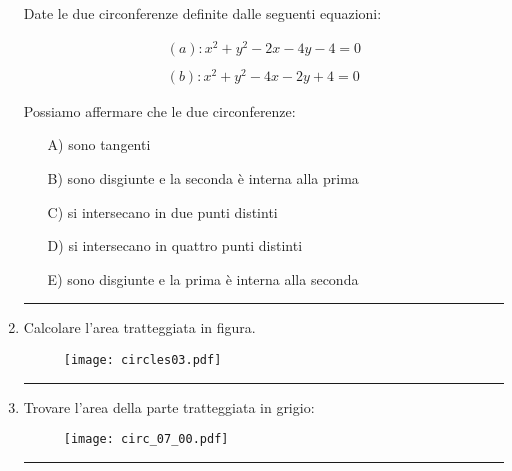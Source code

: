 \begin{enumerate}
Date le due circonferenze definite dalle seguenti equazioni:

\[
\begin{split}
(a): x^2+y^2-2x-4y-4=0 \\
\\
(b): x^2+y^2-4x-2y+4=0
\end{split}
\]

Possiamo affermare che le due circonferenze:

\begin{itemize}
\item[A)] sono tangenti
\item[B)] sono disgiunte e la seconda è interna alla prima
\item[C)] si intersecano in due punti distinti
\item[D)] si intersecano in quattro punti distinti
\item[E)] sono disgiunte e la prima è interna alla seconda
\end{itemize}



\vspace{1cm}
\hrule
\vspace{1cm}


\item  \label{circ_07}

Calcolare l'area tratteggiata in figura.

\begin{figure}[H]
\centering
\texttt{[image: circles03.pdf]}
\end{figure}




\vspace{1cm}
\hrule
\vspace{1cm}


\item  \label{circ_08}

Trovare l'area della parte tratteggiata in grigio:

\begin{figure}[H]
\centering
\texttt{[image: circ\_07\_00.pdf]}
\end{figure}

\vspace{1cm}
\hrule
\vspace{1cm}



\end{enumerate}
